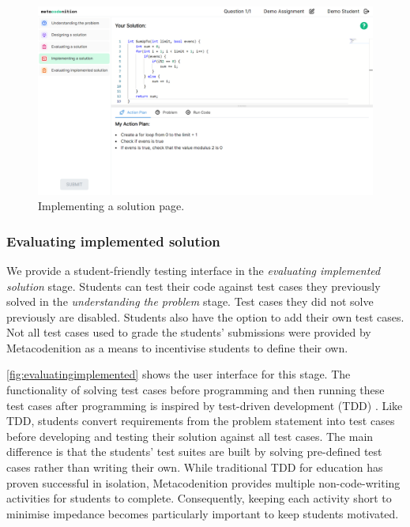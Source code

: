\documentclass[sigconf,anonymous]{acmart}
\begin{document}
\begin{figure}[h!]
  \centering
  \includegraphics[width=\linewidth]{implementing-a-solution}
  \caption{Implementing a solution page.}
  \label{fig:implementing}
\end{figure}

\subsubsection{Evaluating implemented solution} \label{sec:design-interventions-testing}
We provide a student-friendly testing interface in the \emph{evaluating implemented solution} stage. Students can test their code against test cases they previously solved in the \emph{understanding the problem} stage. Test cases they did not solve previously are disabled. Students also have the option to add their own test cases. Not all test cases used to grade the students' submissions were provided by Metacodenition as a means to incentivise students to define their own.

\autoref{fig:evaluatingimplemented} shows the user interface for this stage. The functionality of solving test cases before programming and then running these test cases after programming is inspired by test-driven development (TDD) \cite{janzen2008}. Like TDD, students convert requirements from the problem statement into test cases before developing and testing their solution against all test cases. The main difference is that the students' test suites are built by solving pre-defined test cases rather than writing their own. While traditional TDD for education has proven successful in isolation, Metacodenition provides multiple non-code-writing activities for students to complete. Consequently, keeping each activity short to minimise impedance becomes particularly important to keep students motivated. 
\end{document}
